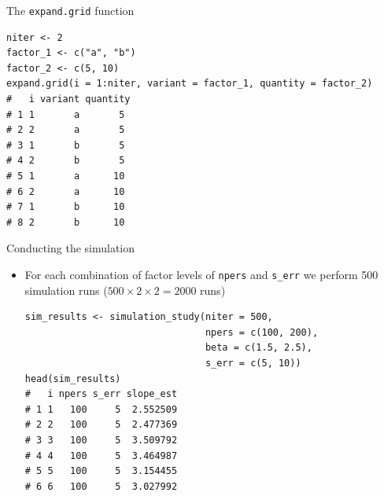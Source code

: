 \documentclass[aspectratio=169]{beamer}
\begin{document}
\begin{frame}[fragile]{The \texttt{expand.grid} function}
\begin{lstlisting}
niter <- 2
factor_1 <- c("a", "b")
factor_2 <- c(5, 10)
expand.grid(i = 1:niter, variant = factor_1, quantity = factor_2)
#   i variant quantity
# 1 1       a       5
# 2 2       a       5
# 3 1       b       5
# 4 2       b       5
# 5 1       a      10
# 6 2       a      10
# 7 1       b      10
# 8 2       b      10
\end{lstlisting}
\end{frame}

\begin{frame}[fragile]{Conducting the simulation}
  \begin{itemize}
    \item For each combination of factor levels of \texttt{npers} and
      \texttt{s\_err} we perform 500 simulation runs ($500 \times 2 \times 2 =
      2000$
      runs)
\begin{lstlisting}
sim_results <- simulation_study(niter = 500,
                                npers = c(100, 200),
                                beta = c(1.5, 2.5),
                                s_err = c(5, 10))
head(sim_results)
#   i npers s_err slope_est
# 1 1   100     5  2.552509
# 2 2   100     5  2.477369
# 3 3   100     5  3.509792
# 4 4   100     5  3.464987
# 5 5   100     5  3.154455
# 6 6   100     5  3.027992
\end{lstlisting}
  \end{itemize}
\end{frame}
\end{document}
